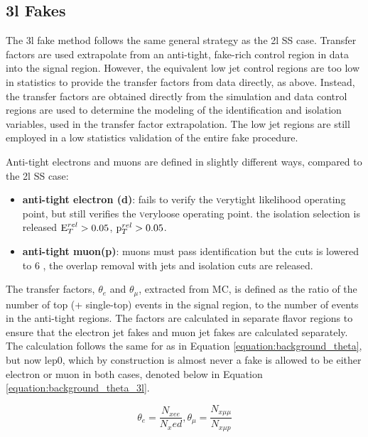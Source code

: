 



\subsection{3l Fakes}

The 3l fake method follows the same general strategy as the 2l SS case. Transfer factors are used extrapolate from an anti-tight, fake-rich control region in data into the signal region.  However, the equivalent low jet control regions are too low in statistics to provide the transfer factors from data directly, as above. Instead, the transfer factors are obtained directly from the \ttbar simulation and data control regions are used to determine the modeling of the identification and isolation variables, used in the transfer factor extrapolation. The low jet regions are still employed in a low statistics validation of the entire fake procedure. 

Anti-tight electrons and muons are defined in slightly different ways, compared to the 2l SS case:
\begin{itemize}
\item {\bf anti-tight electron (d)}: fails to verify the {\textsc verytight} likelihood operating point, but still verifies the {\textsc veryloose} operating point. the isolation selection is released $\rm E_{T}^{rel}>0.05$,  $\rm p_{T}^{rel}>0.05$.

\item {\bf anti-tight muon(p)}: muons must pass identification but the \pt cuts is lowered to 6 \gevc, the overlap removal with jets and isolation cuts are released.
\end{itemize} 
The transfer factors, $\theta_e$ and $\theta_{\mu}$, extracted from MC, is defined as the ratio of the number of top (\ttbar + single-top) events in the signal region, to the number of \ttbar events in the anti-tight regions. The factors are calculated in separate flavor regions to ensure that the electron jet fakes and muon jet fakes are calculated separately. The calculation follows the same for as in Equation \ref{equation:background_theta}, but now lep0, which by construction is almost never a fake is allowed to be either electron or muon in both cases, denoted below in Equation \ref{equation:background_theta_3l}.  

\begin{equation}
\theta_e = \frac{N_{xee}}{N_xed}, \theta_{\mu} = \frac{N_{x\mu\mu}}{N_{x\mu p}}
\label{equation:background_theta_3l}
\end{equation}

